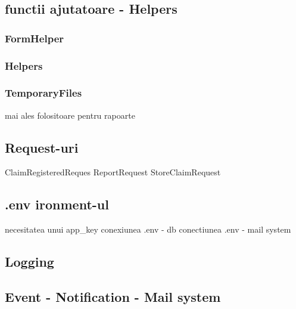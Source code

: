 \subsection{functii ajutatoare - Helpers}
	\subsubsection{FormHelper}
	\subsubsection{Helpers}
	\subsubsection{TemporaryFiles}
	mai ales folositoare pentru rapoarte
\subsection{Request-uri}
	ClaimRegisteredReques
	ReportRequest
	StoreClaimRequest
\subsection{.env ironment-ul}
	necesitatea unui app\_key
	conexiunea .env - db
	conectiunea .env - mail system
\subsection{Logging}
\subsection{Event - Notification - Mail system}